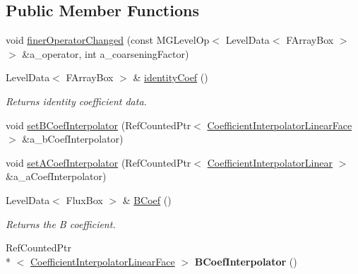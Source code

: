 \subsection*{Public Member Functions}
\begin{DoxyCompactItemize}
\item 
void \hyperlink{class_v_c_a_m_r_poisson_op_time_dep_a8fe2635ec4c9b77915bcdbc005a030e1}{finer\-Operator\-Changed} (const M\-G\-Level\-Op$<$ Level\-Data$<$ F\-Array\-Box $>$ $>$ \&a\-\_\-operator, int a\-\_\-coarsening\-Factor)
\item 
\hypertarget{class_v_c_a_m_r_poisson_op_time_dep_a198481d947fde3cc5ce13d0b90be3a7b}{Level\-Data$<$ F\-Array\-Box $>$ \& \hyperlink{class_v_c_a_m_r_poisson_op_time_dep_a198481d947fde3cc5ce13d0b90be3a7b}{identity\-Coef} ()}\label{class_v_c_a_m_r_poisson_op_time_dep_a198481d947fde3cc5ce13d0b90be3a7b}

\begin{DoxyCompactList}\small\item\em Returns identity coefficient data. \end{DoxyCompactList}\item 
void \hyperlink{class_v_c_a_m_r_poisson_op_time_dep_aa7813bda43745bbf9993d21f04ca698a}{set\-B\-Coef\-Interpolator} (Ref\-Counted\-Ptr$<$ \hyperlink{class_coefficient_interpolator_linear_face}{Coefficient\-Interpolator\-Linear\-Face} $>$ \&a\-\_\-b\-Coef\-Interpolator)
\item 
void \hyperlink{class_v_c_a_m_r_poisson_op_time_dep_abf646f930165adb5c02fea8d53cbdff4}{set\-A\-Coef\-Interpolator} (Ref\-Counted\-Ptr$<$ \hyperlink{class_coefficient_interpolator_linear}{Coefficient\-Interpolator\-Linear} $>$ \&a\-\_\-a\-Coef\-Interpolator)
\item 
\hypertarget{class_v_c_a_m_r_poisson_op_time_dep_a2880ba2dc470323baa1ab9389102a645}{Level\-Data$<$ Flux\-Box $>$ \& \hyperlink{class_v_c_a_m_r_poisson_op_time_dep_a2880ba2dc470323baa1ab9389102a645}{B\-Coef} ()}\label{class_v_c_a_m_r_poisson_op_time_dep_a2880ba2dc470323baa1ab9389102a645}

\begin{DoxyCompactList}\small\item\em Returns the B coefficient. \end{DoxyCompactList}\item 
\hypertarget{class_v_c_a_m_r_poisson_op_time_dep_af92a402c282963f113d3f3a4edfa76d1}{Ref\-Counted\-Ptr\\*
$<$ \hyperlink{class_coefficient_interpolator_linear_face}{Coefficient\-Interpolator\-Linear\-Face} $>$ {\bfseries B\-Coef\-Interpolator} ()}\label{class_v_c_a_m_r_poisson_op_time_dep_af92a402c282963f113d3f3a4edfa76d1}


\end{DoxyCompactItemize}
